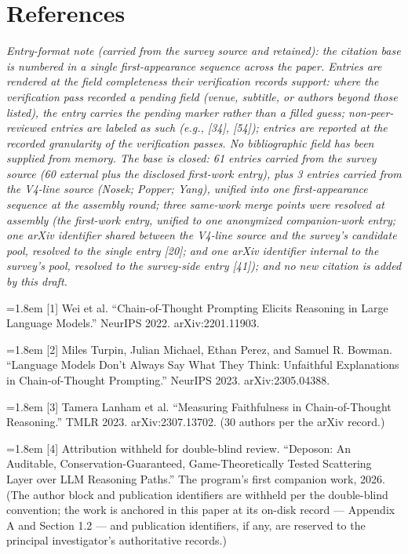 \documentclass[11pt]{article}
\begin{document}
\section*{References}
\noindent\emph{Entry-format note (carried from the survey source and retained): the citation base is numbered in a single first-appearance sequence across the paper. Entries are rendered at the field completeness their verification records support: where the verification pass recorded a pending field (venue, subtitle, or authors beyond those listed), the entry carries the pending marker rather than a filled guess; non-peer-reviewed entries are labeled as such (e.g., [34], [54]); entries are reported at the recorded granularity of the verification passes. No bibliographic field has been supplied from memory. The base is closed: 61 entries carried from the survey source (60 external plus the disclosed first-work entry), plus 3 entries carried from the V4-line source (Nosek; Popper; Yang), unified into one first-appearance sequence at the assembly round; three same-work merge points were resolved at assembly (the first-work entry, unified to one anonymized companion-work entry; one arXiv identifier shared between the V4-line source and the survey's candidate pool, resolved to the single entry [20]; and one arXiv identifier internal to the survey's pool, resolved to the survey-side entry [41]); and no new citation is added by this draft.}\par
\noindent\hangindent=1.8em [1] Wei et al. ``Chain-of-Thought Prompting Elicits Reasoning in Large Language Models.'' NeurIPS 2022. arXiv:2201.11903.\par\medskip
\noindent\hangindent=1.8em [2] Miles Turpin, Julian Michael, Ethan Perez, and Samuel R. Bowman. ``Language Models Don't Always Say What They Think: Unfaithful Explanations in Chain-of-Thought Prompting.'' NeurIPS 2023. arXiv:2305.04388.\par\medskip
\noindent\hangindent=1.8em [3] Tamera Lanham et al. ``Measuring Faithfulness in Chain-of-Thought Reasoning.'' TMLR 2023. arXiv:2307.13702. (30 authors per the arXiv record.)\par\medskip
\noindent\hangindent=1.8em [4] Attribution withheld for double-blind review. ``Deposon: An Auditable, Conservation-Guaranteed, Game-Theoretically Tested Scattering Layer over LLM Reasoning Paths.'' The program's first companion work, 2026. (The author block and publication identifiers are withheld per the double-blind convention; the work is anchored in this paper at its on-disk record — Appendix A and Section 1.2 — and publication identifiers, if any, are reserved to the principal investigator's authoritative records.)\par\medskip
\end{document}
